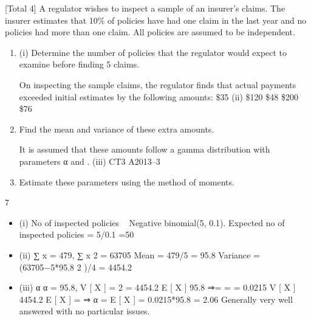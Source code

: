 \documentclass[a4paper,12pt]{article}
\begin{document}
[Total 4]
A regulator wishes to inspect a sample of an insurer’s claims. The insurer estimates that 10\% of policies have had one claim in the last year and no policies had more than
one claim. All policies are assumed to be independent.
\begin{enumerate}
\item (i)
Determine the number of policies that the regulator would expect to examine before finding 5 claims.

On inspecting the sample claims, the regulator finds that actual payments exceeded
initial estimates by the following amounts:
\$35
(ii)
\$120
\$48
\$200
\$76
\item Find the mean and variance of these extra amounts.

It is assumed that these amounts follow a gamma distribution with parameters α
and \lambda.
(iii)
CT3 A2013–3
\item Estimate these parameters using the method of moments.

\end{enumerate}

7
\begin{itemize}
\item (i) No of inspected policies ~ Negative binomial(5, 0.1).
Expected no of inspected policies = 5/0.1 =50
\item (ii) ∑ x = 479, ∑ x 2 = 63705
Mean = 479/5 = 95.8
Variance = (63705−5*95.8 2 )/4 = 4454.2
\item (iii)
α
α
= 95.8, V [ X ] = 2 = 4454.2
\lambda
\lambda
E [ X ]
95.8
⇒\lambda=
=
= 0.0215
V [ X ] 4454.2
E [ X ] =
⇒ α = \lambda E [ X ] = 0.0215*95.8 = 2.06
Generally very well answered with no particular issues.
\end{itemize}
\end{document}
